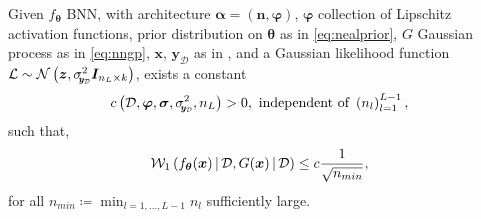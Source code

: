 \begin{corollary} \label{cor:convposterior}
	Given $f_{\bm{\theta}}$ BNN, with architecture $\bm{\alpha} = (\bm{n}, \bm{\varphi})$, $\bm{\varphi}$ collection of Lipschitz activation functions, prior distribution on $\bm{\theta}$ as in \cref{eq:nealprior}, $G$ Gaussian process as in \cref{eq:nngp}, $\bm{x}$, $\bm{y}_{\mathcal{D}}$ as in , and a Gaussian likelihood function $\mathcal{L} \sim \normal{\bm{z}}{\sigmay^2 \bm{I}_{n_L \times k}}$, exists a constant
	\begin{equation*}
		c\left(\train, \bm{\varphi}, \bm{\sigma}, \sigmay^2, n_L\right) > 0, \text{ independent of } \left(n_l\right)_{l = 1}^{L - 1},
	\end{equation*}
	such that,
	\begin{equation*}
		\wass[1]{f_{\bm{\theta}}(\bm{x}) \given \train}{G(\bm{x}) \given \train} \leq c \frac{1}{\sqrt{n_{min}}},
	\end{equation*}
	for all $\displaystyle n_{min} \coloneqq \min_{l = 1, \dots, L - 1} n_l$ sufficiently large.
\end{corollary}
